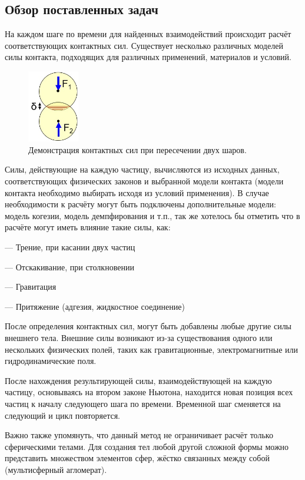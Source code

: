 \documentclass[a4paper]{article}
\begin{document}
\subsection{Обзор поставленных задач}

На каждом шаге по времени для найденных взаимодействий происходит расчёт соответствующих контактных сил.
Существует несколько различных моделей силы контакта, подходящих для различных применений, материалов и условий.

\begin{figure}[h!]
	\centering
	\includegraphics[width=0.2\textwidth]{vhod}
	\caption{Демонстрация контактных сил при пересечении двух шаров.}
\end{figure} 

Силы, действующие на каждую частицу, вычисляются из исходных данных, соответствующих физических законов и выбранной модели контакта (модели контакта необходимо выбирать исходя из условий применения). 
В случае необходимости к расчёту могут быть подключены дополнительные модели: модель когезии, модель демпфирования и т.п., так же хотелось бы отметить что в расчёте могут иметь влияние такие силы, как:

--- Трение, при касании двух частиц

--- Отскакивание, при столкновении

--- Гравитация

--- Притяжение (адгезия, жидкостное соединение)

После определения контактных сил, могут быть добавлены любые другие силы внешнего тела. 
Внешние силы возникают из-за существования одного или нескольких физических полей, таких как гравитационные, электромагнитные или гидродинамические поля.

После нахождения результирующей силы, взаимодействующей на каждую частицу, основываясь на втором законе Ньютона, находится новая позиция всех частиц к началу следующего шага по времени.
Временной шаг сменяется на следующий и цикл повторяется.

Важно также упомянуть, что данный метод не ограничивает расчёт только сферическими телами. Для создания тел любой другой сложной формы можно представить множеством элементов сфер, жёстко связанных между собой (мультисферный агломерат).
\end{document}
